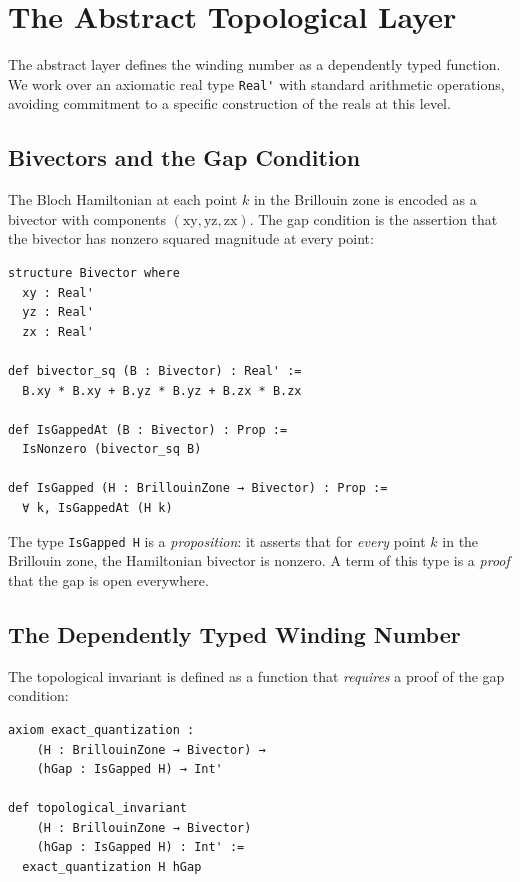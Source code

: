 \documentclass[11pt,a4paper]{article}
\newcommand{\lean}[1]{\lstinline[language=Lean4]{#1}}
\begin{document}
\section{The Abstract Topological Layer}
\label{sec:abstract}

The abstract layer defines the winding number as a dependently typed function. We work over an axiomatic real type \lean{Real'} with standard arithmetic operations, avoiding commitment to a specific construction of the reals at this level.

\subsection{Bivectors and the Gap Condition}

The Bloch Hamiltonian at each point $k$ in the Brillouin zone is encoded as a bivector with components $(\mathrm{xy}, \mathrm{yz}, \mathrm{zx})$. The gap condition is the assertion that the bivector has nonzero squared magnitude at every point:

\begin{lstlisting}
structure Bivector where
  xy : Real'
  yz : Real'
  zx : Real'

def bivector_sq (B : Bivector) : Real' :=
  B.xy * B.xy + B.yz * B.yz + B.zx * B.zx

def IsGappedAt (B : Bivector) : Prop :=
  IsNonzero (bivector_sq B)

def IsGapped (H : BrillouinZone → Bivector) : Prop :=
  ∀ k, IsGappedAt (H k)
\end{lstlisting}

The type \lean{IsGapped H} is a \emph{proposition}: it asserts that for \emph{every} point $k$ in the Brillouin zone, the Hamiltonian bivector is nonzero. A term of this type is a \emph{proof} that the gap is open everywhere.

\subsection{The Dependently Typed Winding Number}

The topological invariant is defined as a function that \emph{requires} a proof of the gap condition:

\begin{lstlisting}
axiom exact_quantization :
    (H : BrillouinZone → Bivector) →
    (hGap : IsGapped H) → Int'

def topological_invariant
    (H : BrillouinZone → Bivector)
    (hGap : IsGapped H) : Int' :=
  exact_quantization H hGap
\end{lstlisting}
\end{document}
